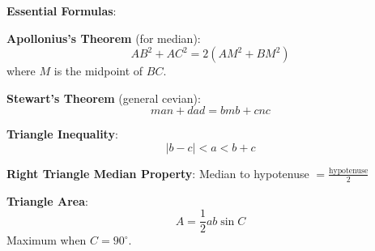 \documentclass[12pt]{article}
\begin{document}
\vspace{0.5cm}

\textbf{Essential Formulas}:

\textbf{Apollonius's Theorem} (for median):
$$AB^2 + AC^2 = 2(AM^2 + BM^2)$$
where $M$ is the midpoint of $BC$.

\textbf{Stewart's Theorem} (general cevian):
$$man + dad = bmb + cnc$$

\textbf{Triangle Inequality}:
$$|b - c| < a < b + c$$

\textbf{Right Triangle Median Property}:
Median to hypotenuse $= \frac{\text{hypotenuse}}{2}$

\textbf{Triangle Area}:
$$A = \frac{1}{2}ab\sin C$$
Maximum when $C = 90^{\circ}$.
\end{document}
